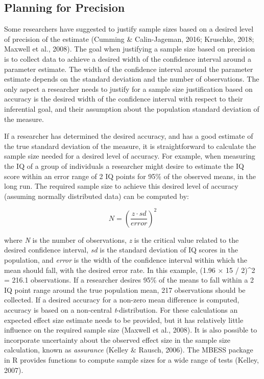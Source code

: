 \documentclass[
  english,
  ,jou, a4paper,floatsintext]{apa6}
\begin{document}
\hypertarget{planning-for-precision}{%
\subsection{Planning for Precision}\label{planning-for-precision}}

Some researchers have suggested to justify sample sizes based on a desired level of precision of the estimate (Cumming \& Calin-Jageman, 2016; Kruschke, 2018; Maxwell et al., 2008). The goal when justifying a sample size based on precision is to collect data to achieve a desired width of the confidence interval around a parameter estimate. The width of the confidence interval around the parameter estimate depends on the standard deviation and the number of observations. The only aspect a researcher needs to justify for a sample size justification based on accuracy is the desired width of the confidence interval with respect to their inferential goal, and their assumption about the population standard deviation of the measure.

If a researcher has determined the desired accuracy, and has a good estimate of the true standard deviation of the measure, it is straightforward to calculate the sample size needed for a desired level of accuracy. For example, when measuring the IQ of a group of individuals a researcher might desire to estimate the IQ score within an error range of 2 IQ points for 95\% of the observed means, in the long run. The required sample size to achieve this desired level of accuracy (assuming normally distributed data) can be computed by:

\[N = \left(\frac{z \cdot sd}{error}\right)^2\]

where \emph{N} is the number of observations, \emph{z} is the critical value related to the desired confidence interval, \emph{sd} is the standard deviation of IQ scores in the population, and \emph{error} is the width of the confidence interval within which the mean should fall, with the desired error rate. In this example, (1.96 × 15 / 2)\^{}2 = 216.1 observations. If a researcher desires 95\% of the means to fall within a 2 IQ point range around the true population mean, 217 observations should be collected. If a desired accuracy for a non-zero mean difference is computed, accuracy is based on a non-central \emph{t}-distribution. For these calculations an expected effect size estimate needs to be provided, but it has relatively little influence on the required sample size (Maxwell et al., 2008). It is also possible to incorporate uncertainty about the observed effect size in the sample size calculation, known as \emph{assurance} (Kelley \& Rausch, 2006). The MBESS package in R provides functions to compute sample sizes for a wide range of tests (Kelley, 2007).
\end{document}
